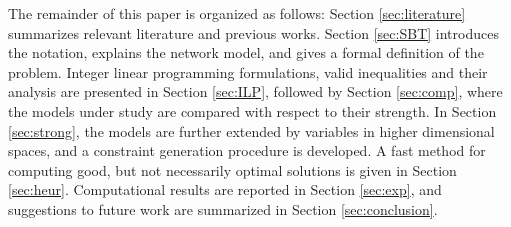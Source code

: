 The remainder of this paper is organized as follows: 
Section \ref{sec:literature} summarizes relevant literature and previous works.
Section \ref{sec:SBT} introduces the notation, explains the network model, and gives a formal definition of the problem.
Integer linear programming formulations, valid inequalities and their analysis are presented in Section \ref{sec:ILP},
followed by Section \ref{sec:comp}, where the models under study are compared with respect to their strength.
In Section \ref{sec:strong}, the models are further extended by variables in higher dimensional spaces,
and a constraint generation procedure is developed.
A fast method for computing good, but not necessarily optimal solutions is given in Section \ref{sec:heur}.
Computational results are reported in Section \ref{sec:exp},
and suggestions to future work are summarized in Section \ref{sec:conclusion}.
\newline
